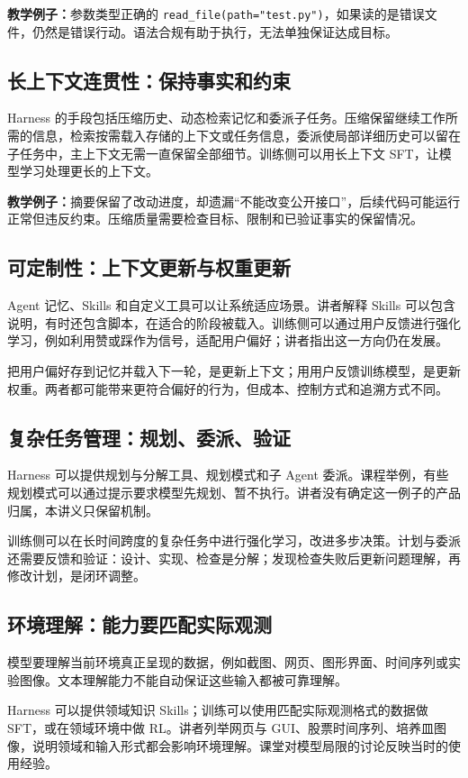 \documentclass[11pt,a4paper]{article}
\begin{document}
\textbf{教学例子：}参数类型正确的 \texttt{read\_file(path="test.py")}，如果读的是错误文件，仍然是错误行动。语法合规有助于执行，无法单独保证达成目标。

\subsection{长上下文连贯性：保持事实和约束}
Harness 的手段包括压缩历史、动态检索记忆和委派子任务。压缩保留继续工作所需的信息，检索按需载入存储的上下文或任务信息，委派使局部详细历史可以留在子任务中，主上下文无需一直保留全部细节。训练侧可以用长上下文 SFT，让模型学习处理更长的上下文。

\textbf{教学例子：}摘要保留了改动进度，却遗漏“不能改变公开接口”，后续代码可能运行正常但违反约束。压缩质量需要检查目标、限制和已验证事实的保留情况。

\subsection{可定制性：上下文更新与权重更新}
Agent 记忆、Skills 和自定义工具可以让系统适应场景。讲者解释 Skills 可以包含说明，有时还包含脚本，在适合的阶段被载入。训练侧可以通过用户反馈进行强化学习，例如利用赞或踩作为信号，适配用户偏好；讲者指出这一方向仍在发展。

把用户偏好存到记忆并载入下一轮，是更新上下文；用用户反馈训练模型，是更新权重。两者都可能带来更符合偏好的行为，但成本、控制方式和追溯方式不同。

\subsection{复杂任务管理：规划、委派、验证}
Harness 可以提供规划与分解工具、规划模式和子 Agent 委派。课程举例，有些规划模式可以通过提示要求模型先规划、暂不执行。讲者没有确定这一例子的产品归属，本讲义只保留机制。

训练侧可以在长时间跨度的复杂任务中进行强化学习，改进多步决策。计划与委派还需要反馈和验证：设计、实现、检查是分解；发现检查失败后更新问题理解，再修改计划，是闭环调整。

\subsection{环境理解：能力要匹配实际观测}
模型要理解当前环境真正呈现的数据，例如截图、网页、图形界面、时间序列或实验图像。文本理解能力不能自动保证这些输入都被可靠理解。

Harness 可以提供领域知识 Skills；训练可以使用匹配实际观测格式的数据做 SFT，或在领域环境中做 RL。讲者列举网页与 GUI、股票时间序列、培养皿图像，说明领域和输入形式都会影响环境理解。课堂对模型局限的讨论反映当时的使用经验。
\end{document}
